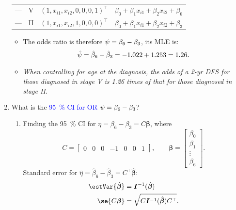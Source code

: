 \documentclass{article}\usepackage[]{graphicx}\usepackage[svgnames]{xcolor}
\let\exp\relax%
\providecommand{\Vector}[1]{\bm{#1}}%
\providecommand{\Matrix}[1]{\bm{#1}}
\begin{document}
\begin{enumerate}[label={Q\arabic*:}]
\begin{table}[!htbp]
\begin{tabular}{cccl}
                  \midrule
                  --- & V     & $ (1,x_{i1},x_{i2},0,0,0,1)^\top $ & $ \beta_0+\beta_1x_{i1}+\beta_2x_{i2}+\beta_6 $ \\
                  --- & II    & $ (1,x_{i1},x_{i2},1,0,0,0)^\top $ & $ \beta_0+\beta_1x_{i1}+\beta_2x_{i2}+\beta_3 $ \\
                  \bottomrule
              \end{tabular}
          \end{table}
          \begin{itemize}
              \item The odds ratio is therefore $ \psi=\exp{\beta_6-\beta_3} $, its MLE is:
                    \[ \hat{\psi}=\exp{\hat{\beta}_6-\hat{\beta}_3}=\exp{-1.022+1.253}=1.26. \]
              \item \emph{When controlling for age at the diagnosis, the odds of a 2-yr DFS for those
                        diagnosed in stage V is 1.26 times of that for those diagnosed in stage II}.
          \end{itemize}
    \item What is the \textcolor{Blue}{\qty{95}{\percent} CI for OR $ \psi=\exp{\beta_6-\beta_3} $}?
          \begin{enumerate}[1.]
              \item Finding the \qty{95}{\percent} CI for $ \eta=\beta_6-\beta_3=C \Vector{\beta} $, where
                    \[ C=\begin{bmatrix}
                            0 & 0 & 0 & -1 & 0 & 0 & 1
                        \end{bmatrix},\qquad \Vector{\beta}=\begin{bmatrix}
                            \beta_0 \\
                            \beta_1 \\
                            \vdots  \\
                            \beta_6
                        \end{bmatrix}. \]
                    Standard error for $ \hat{\eta}=\hat{\beta}_6-\hat{\beta}_3=C^\top\hat{\Vector{\beta}} $:
                    \begin{align*}
                        \estVar{\hat{\Vector{\beta}}} & =\Matrix{I}^{-1}(\hat{\Vector{\beta}})                \\
                        \se{C\Vector{\beta}}          & =\sqrt{C\Matrix{I}^{-1}(\hat{\Vector{\beta}})C^\top}.
                    \end{align*}

\end{enumerate}
\end{enumerate}
\end{document}

